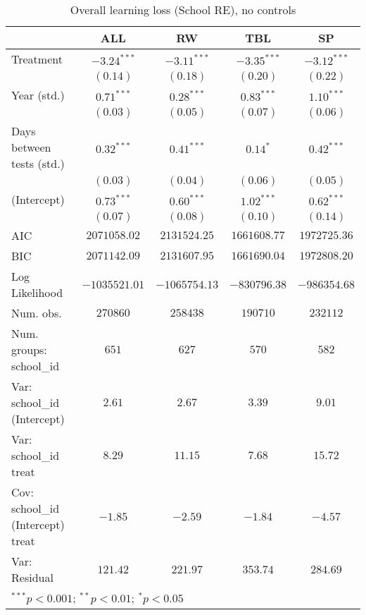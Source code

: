 
\begin{table}
\begin{center}
\begin{tabular}{l c c c c}
\hline
 & ALL & RW & TBL & SP \\
\hline
Treatment                         & $-3.24^{***}$ & $-3.11^{***}$ & $-3.35^{***}$ & $-3.12^{***}$ \\
                                  & $(0.14)$      & $(0.18)$      & $(0.20)$      & $(0.22)$      \\
Year (std.)                       & $0.71^{***}$  & $0.28^{***}$  & $0.83^{***}$  & $1.10^{***}$  \\
                                  & $(0.03)$      & $(0.05)$      & $(0.07)$      & $(0.06)$      \\
Days between tests (std.)         & $0.32^{***}$  & $0.41^{***}$  & $0.14^{*}$    & $0.42^{***}$  \\
                                  & $(0.03)$      & $(0.04)$      & $(0.06)$      & $(0.05)$      \\
(Intercept)                       & $0.73^{***}$  & $0.60^{***}$  & $1.02^{***}$  & $0.62^{***}$  \\
                                  & $(0.07)$      & $(0.08)$      & $(0.10)$      & $(0.14)$      \\
\hline
AIC                               & $2071058.02$  & $2131524.25$  & $1661608.77$  & $1972725.36$  \\
BIC                               & $2071142.09$  & $2131607.95$  & $1661690.04$  & $1972808.20$  \\
Log Likelihood                    & $-1035521.01$ & $-1065754.13$ & $-830796.38$  & $-986354.68$  \\
Num. obs.                         & $270860$      & $258438$      & $190710$      & $232112$      \\
Num. groups: school\_id           & $651$         & $627$         & $570$         & $582$         \\
Var: school\_id (Intercept)       & $2.61$        & $2.67$        & $3.39$        & $9.01$        \\
Var: school\_id treat             & $8.29$        & $11.15$       & $7.68$        & $15.72$       \\
Cov: school\_id (Intercept) treat & $-1.85$       & $-2.59$       & $-1.84$       & $-4.57$       \\
Var: Residual                     & $121.42$      & $221.97$      & $353.74$      & $284.69$      \\
\hline
\multicolumn{5}{l}{\scriptsize{$^{***}p<0.001$; $^{**}p<0.01$; $^{*}p<0.05$}}
\end{tabular}
\caption{Overall learning loss (School RE), no controls}
\label{table:school_re_base}
\end{center}
\end{table}
